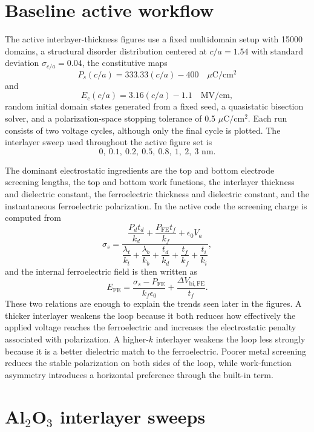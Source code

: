 \documentclass[11pt]{article}
\newcommand{\uc}{\ensuremath{\mu\text{C}/\text{cm}^2}}
\newcommand{\mvcm}{\ensuremath{\text{MV}/\text{cm}}}
\begin{document}
\section{Baseline active workflow}

The active interlayer-thickness figures use a fixed multidomain setup with
15000 domains, a structural disorder distribution centered at $c/a = 1.54$ with
standard deviation $\sigma_{c/a} = 0.04$, the constitutive maps
\[
P_s(c/a) = 333.33(c/a) - 400 \quad \uc
\]
and
\[
E_c(c/a) = 3.16(c/a) - 1.1 \quad \mvcm,
\]
random initial domain states generated from a fixed seed, a quasistatic
bisection solver, and a polarization-space stopping tolerance of 0.5 \uc. Each
run consists of two voltage cycles, although only the final cycle is plotted.
The interlayer sweep used throughout the active figure set is
\[
0,\ 0.1,\ 0.2,\ 0.5,\ 0.8,\ 1,\ 2,\ 3 \text{ nm}.
\]

The dominant electrostatic ingredients are the top and bottom electrode
screening lengths, the top and bottom work functions, the interlayer thickness
and dielectric constant, the ferroelectric thickness and dielectric constant,
and the instantaneous ferroelectric polarization. In the active code the
screening charge is computed from
\begin{equation}
\sigma_s =
\frac{
\dfrac{P_d t_d}{k_d}
+
\dfrac{P_{\mathrm{FE}} t_f}{k_f}
+
\epsilon_0 V_a
}{
\dfrac{\lambda_t}{k_t}
+
\dfrac{\lambda_b}{k_b}
+
\dfrac{t_d}{k_d}
+
\dfrac{t_f}{k_f}
+
\dfrac{t_i}{k_i}
},
\label{eq:sigma-active-report}
\end{equation}
and the internal ferroelectric field is then written as
\begin{equation}
E_{\mathrm{FE}} =
\frac{\sigma_s - P_{\mathrm{FE}}}{k_f \epsilon_0}
+
\frac{\Delta V_{\mathrm{bi,FE}}}{t_f}.
\label{eq:efe-active-report}
\end{equation}
These two relations are enough to explain the trends seen later in the figures.
A thicker interlayer weakens the loop because it both reduces how effectively
the applied voltage reaches the ferroelectric and increases the electrostatic
penalty associated with polarization. A higher-$k$ interlayer weakens the loop
less strongly because it is a better dielectric match to the ferroelectric.
Poorer metal screening reduces the stable polarization on both sides of the
loop, while work-function asymmetry introduces a horizontal preference through
the built-in term.

\section{Al$_2$O$_3$ interlayer sweeps}
\end{document}
